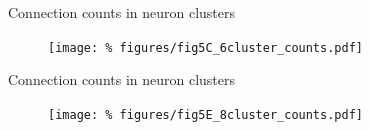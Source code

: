 \begin{frame}{Connection counts in neuron clusters}



  \begin{figure}
    \centering
    \texttt{[image: \%
    figures/fig5C\_6cluster\_counts.pdf]} %
  \end{figure} 
  
\end{frame}


\begin{frame}{Connection counts in neuron clusters}

  \vspace{0.1cm}

  \vspace{-0.5cm}

  \begin{figure}
    \centering
    \texttt{[image: \%
    figures/fig5E\_8cluster\_counts.pdf]} %
  \end{figure} 
  
\end{frame}
